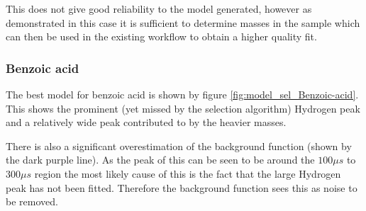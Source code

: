 \documentclass[a4paper]{article}
\begin{document}
This does not give good reliability to the model generated, however as
demonstrated in this case it is sufficient to determine masses in the sample
which can then be used in the existing workflow to obtain a higher quality fit.

\subsubsection{Benzoic acid}

The best model for benzoic acid is shown by figure
\ref{fig:model_sel_Benzoic-acid}. This shows the prominent (yet missed by the
selection algorithm) Hydrogen peak and a relatively wide peak contributed to by
the heavier masses.

There is also a significant overestimation of the background function (shown by
the dark purple line). As the peak of this can be seen to be around the $100 \mu
s$ to $300 \mu s$ region the most likely cause of this is the fact that the
large Hydrogen peak has not been fitted. Therefore the background function sees
this as noise to be removed.
\end{document}
